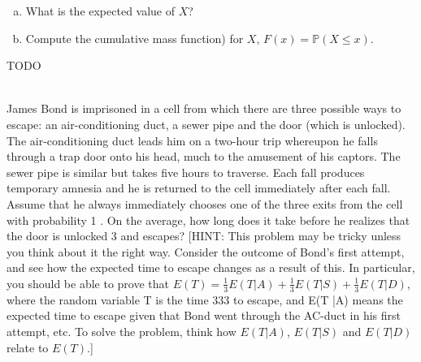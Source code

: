 \documentclass[]{article}
\newif\ifsolutions
\renewcommand{\answer}[1]{{\color{mydarkblue}\textbf{Solution:}#1}}
\begin{document}
\begin{qunlist}
\begin{enumerate}[a)]
\ifsolutions{ \answer{ The probability of getting $x$ tails is $(1-p)^x$. Therefore the probability of getting $x$ tails, then getting a head is
	\[ f(x) = (1-p)^x p. \]
	To show this is a valid probability distribution, we need to make sure the sum of $f(x)$ over all possible $x$ is 1. Using the formula for an infinite geometric series,
	\[ \sum_{x=0}^{\infty} f(x) = p \sum_{x=0}^{\infty} (1-p)^x = p \cdot \frac{1}{1-(1-p)} = 1. \]
}}\fi

\qpart
\item What is the expected value of $X$?


\qpart
\item Compute the cumulative mass function) for $X$, $F(x) = \mathbb{P}(X \leq x)$.

\ifsolutions{ \answer{ 
	We can use the formula for a finite geometric series to find $F(x)$,
	\[ F(x) = p \sum_{y=0}^x (1-p)^y = p \cdot \frac{1 - (1-p)^x}{1 - (1-p)} = 1 - (1-p)^x. \]
}}\fi

\end{enumerate}



TODO


 \\
James Bond is imprisoned in a cell from which there are three possible ways to escape: an air-conditioning
duct, a sewer pipe and the door (which is unlocked). The air-conditioning duct leads him on a two-hour trip
whereupon he falls through a trap door onto his head, much to the amusement of his captors. The sewer pipe
is similar but takes five hours to traverse. Each fall produces temporary amnesia and he is returned to the
cell immediately after each fall. Assume that he always immediately chooses one of the three exits from the
cell with probability 1 . On the average, how long does it take before he realizes that the door is unlocked 3
and escapes?
[HINT: This problem may be tricky unless you think about it the right way. Consider the outcome of Bond's
first attempt, and see how the expected time to escape changes as a result of this. In particular, you should
be able to prove that $E(T) = \frac{1}{3}E(T|A) + \frac{1}{3}E(T|S) + \frac{1}{3}E(T|D)$, where the random variable T is the time 333
to escape, and E(T |A) means the expected time to escape given that Bond went through the AC-duct in his first attempt, etc. To solve the problem, think how $E(T |A)$, $E(T |S)$ and $E(T |D)$ relate to $E(T )$.]


\end{qunlist}
\end{document}
